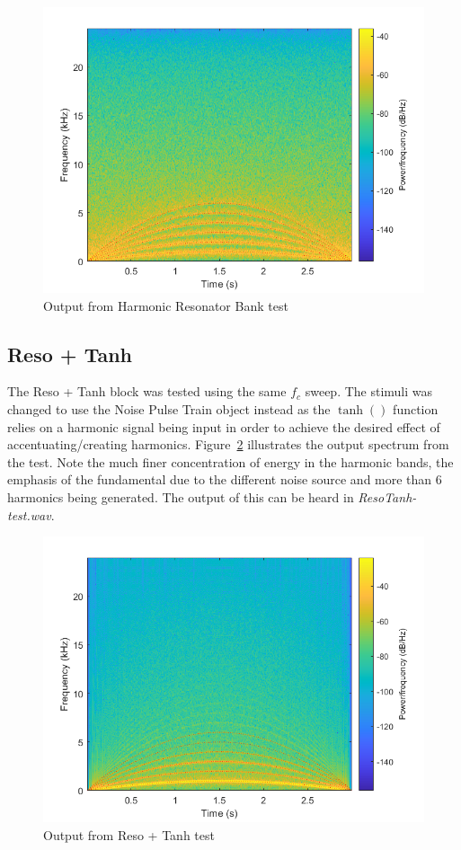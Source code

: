 \documentclass[../main.tex]{subfiles}
\begin{document}
\begin{figure}[h]
    \centering
    \includegraphics[scale=.65]{./images/plots/HRBTest.png}
    \caption{Output from Harmonic Resonator Bank test}
    \label{fig:HRBTest}
\end{figure}

\subsection{Reso + Tanh}
The Reso + Tanh block was tested using the same $f_c$ sweep. The stimuli was changed to use the Noise Pulse Train object instead as the $\tanh()$ function relies on a harmonic signal being input in order to achieve the desired effect of accentuating/creating harmonics. Figure~\ref{fig:ResoTanhTest} illustrates the output spectrum from the test. Note the much finer concentration of energy in the harmonic bands, the emphasis of the fundamental due to the different noise source and more than 6 harmonics being generated. The output of this can be heard in \emph{ResoTanh-test.wav}.

\begin{figure}[h]
    \centering
    \includegraphics[scale=.65]{./images/plots/ResoTanhTest.png}
    \caption{Output from Reso + Tanh test}
    \label{fig:ResoTanhTest}
\end{figure}
\end{document}
